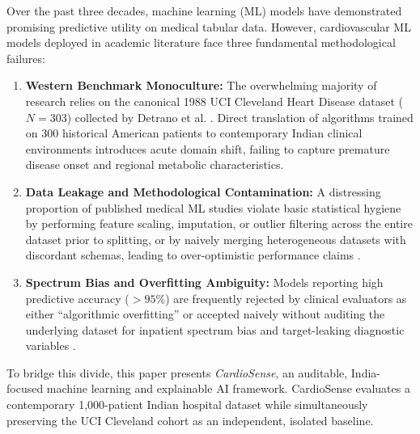 \documentclass[conference]{IEEEtran}
\begin{document}
Over the past three decades, machine learning (ML) models have demonstrated promising predictive utility on medical tabular data. However, cardiovascular ML models deployed in academic literature face three fundamental methodological failures:
\begin{enumerate}
    \item \textbf{Western Benchmark Monoculture:} The overwhelming majority of research relies on the canonical 1988 UCI Cleveland Heart Disease dataset ($N=303$) collected by Detrano et al. \cite{uci}. Direct translation of algorithms trained on 300 historical American patients to contemporary Indian clinical environments introduces acute domain shift, failing to capture premature disease onset and regional metabolic characteristics.
    \item \textbf{Data Leakage and Methodological Contamination:} A distressing proportion of published medical ML studies violate basic statistical hygiene by performing feature scaling, imputation, or outlier filtering across the entire dataset prior to splitting, or by naively merging heterogeneous datasets with discordant schemas, leading to over-optimistic performance claims \cite{sklearnpitfalls,collins2024}.
    \item \textbf{Spectrum Bias and Overfitting Ambiguity:} Models reporting high predictive accuracy ($>95\%$) are frequently rejected by clinical evaluators as either ``algorithmic overfitting'' or accepted naively without auditing the underlying dataset for inpatient spectrum bias and target-leaking diagnostic variables \cite{moons2025}.
\end{enumerate}

To bridge this divide, this paper presents \textit{CardioSense}, an auditable, India-focused machine learning and explainable AI framework. CardioSense evaluates a contemporary 1,000-patient Indian hospital dataset while simultaneously preserving the UCI Cleveland cohort as an independent, isolated baseline. 
\end{document}
